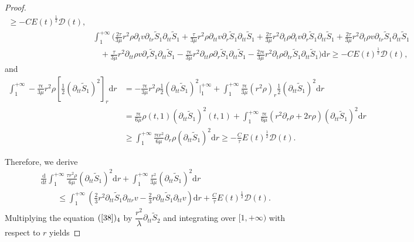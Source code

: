 \documentclass[10pt,reqno]{amsart}
\numberwithin{equation}{section}
\begin{document}
\begin{proof}
\begin{equation}
\begin{aligned}
				\geq -CE(t)^{\frac{1}{2}} \mathcal{D}(t),\\
				&\int_{1}^{+\infty}\bigg(\frac{2\tau}{3 \mu}r^2\rho\partial_{t}v\partial_{tr} \tilde{S}_1\partial_{tt} \tilde{S}_1+\frac{\tau}{3 \mu}r^2\rho\partial_{tt}v\partial_{r} \tilde{S}_1\partial_{tt} \tilde{S}_1
				+\frac{2\tau}{3 \mu}r^2\partial_{t}\rho\partial_{t}v\partial_{r} \tilde{S}_1\partial_{tt} \tilde{S}_1
				+\frac{2\tau}{3 \mu}r^2\partial_{t}\rho v \partial_{tr} \tilde{S}_1\partial_{tt} \tilde{S}_1\\
				&~~~~
				+\frac{\tau}{3 \mu}r^2\partial_{tt}\rho v\partial_{r} \tilde{S}_1\partial_{tt} \tilde{S}_1-\frac{\tau\epsilon}{3 \mu}r^2\partial_{tt}\rho \partial_{r}\tilde{S}_1\partial_{tt} \tilde{S}_1
				-\frac{2\tau\epsilon}{3 \mu}r^2\partial_{t}\rho\partial_{tr}\tilde{S}_1\partial_{tt}\tilde{S}_1\bigg)\mathrm{d}r
				\geq-CE(t)^{\frac{1}{2}} \mathcal{D}(t),
			\end{aligned}
		\end{equation}
		and
		\begin{equation}\nonumber
			\begin{aligned}
				\int_{1}^{+\infty}-\frac{\tau\epsilon}{3 \mu}r^2\rho[\frac{1}{2}(\partial_{tt}\tilde{S}_1)^2]_r \mathrm{d}r
				&=-\frac{\tau\epsilon}{3 \mu}r^2\rho\frac{1}{2}(\partial_{tt}\tilde{S}_1)^2\bigg|_{1}^{+\infty}
				+\int_{1}^{+\infty}\frac{\tau\epsilon}{3 \mu}(r^2\rho)_r\frac{1}{2}(\partial_{tt}\tilde{S}_1)^2\mathrm{d}r\\
				&=\frac{\tau\epsilon}{6\mu}\rho(t,1)(\partial_{tt}\tilde{S}_1)^2(t,1) +\int_{1}^{+\infty}\frac{\tau\epsilon}{6 \mu}(r^2\partial_{r}\rho+2r\rho)(\partial_{tt}\tilde{S}_1)^2\mathrm{d}r\\
				&\geq  \int_{1}^{+\infty}\frac{\tau\epsilon r^2}{6 \mu}\partial_{r}\rho(\partial_{tt}\tilde{S}_1)^2\mathrm{d}r
				\geq-\frac{C}{\tau}E(t)^{\frac{1}{2}} \mathcal{D}(t).
			\end{aligned}
		\end{equation}
		
		Therefore, we derive
		\begin{equation}
		\begin{aligned}\label{42aa}
			&\frac{\mathrm{d}}{\mathrm{d} t}\int_{1}^{+\infty}\frac{\tau r^2 \rho}{6\mu}(\partial_{tt} \tilde{S}_1)^2\mathrm{d}r
			+\int_{1}^{+\infty}\frac{r^2}{3 \mu}(\partial_{tt}\tilde{S}_1)^2\mathrm{d}r\\
			&\qquad
			\leq \int_{1}^{+\infty}\left(\frac{2}{3}r^2\partial_{tt} \tilde{S}_1\partial_{ttr}v
			-\frac{2}{3}r\partial_{tt} \tilde{S}_1\partial_{tt}v\right) \mathrm{d}r
			+\frac{C}{\tau}E(t)^{\frac{1}{2}} \mathcal{D}(t).
		\end{aligned}
		\end{equation}
		Multiplying the equation $(\ref{38})_4$ 
		by $\dfrac{r^2}{\lambda}\partial_{tt} \tilde{S}_2$ and integrating over $[1,+\infty)$ with respect to $r$ yields
		

\end{proof}
\end{document}
